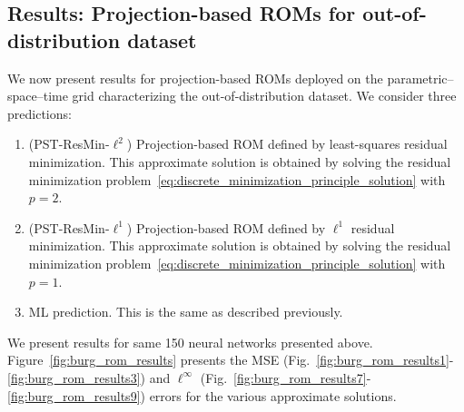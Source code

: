 \documentclass[3p,computermodern,10pt]{elsarticle}
\begin{document}
\subsection{Results: Projection-based ROMs for out-of-distribution dataset}
We now present results for projection-based ROMs deployed on the parametric--space--time grid characterizing the out-of-distribution dataset. We consider three predictions: 
\begin{enumerate}
\item (PST-ResMin-$\ell^2$) Projection-based ROM defined by least-squares residual minimization. This approximate solution is obtained by solving the residual minimization problem~\eqref{eq:discrete_minimization_principle_solution} with $p=2$.
 \item (PST-ResMin-$\ell^1$) Projection-based ROM defined by $\ell^1$ residual minimization. This approximate solution is obtained by solving the residual minimization problem~\eqref{eq:discrete_minimization_principle_solution} with $p=1$.
\item ML prediction. This is the same as described previously.
\end{enumerate}
We present results for same 150 neural networks presented above. Figure~\ref{fig:burg_rom_results} presents the MSE (Fig.~\ref{fig:burg_rom_results1}-\ref{fig:burg_rom_results3}) and %
$\ell^{\infty}$ (Fig.~\ref{fig:burg_rom_results7}-\ref{fig:burg_rom_results9}) errors for the various approximate solutions. %
\end{document}

